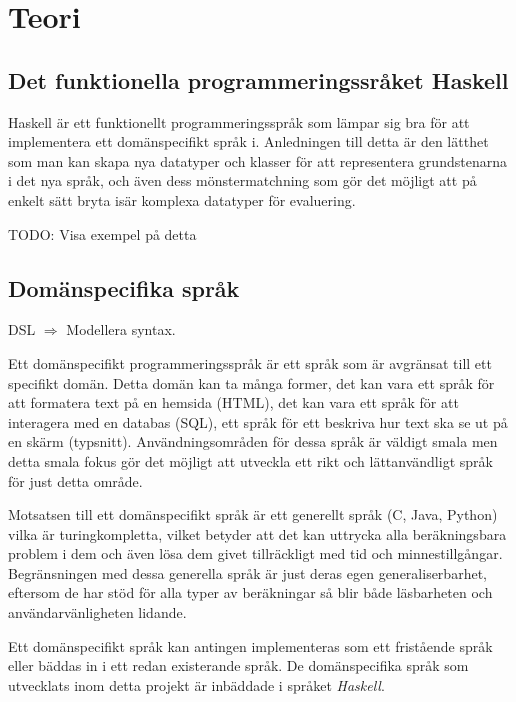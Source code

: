 
\chapter{Teori}

\section{Det funktionella programmeringssråket Haskell}

\begin{binge}
  Haskell är ett funktionellt programmeringsspråk som lämpar sig bra för att
  implementera ett domänspecifikt språk i. Anledningen till detta är den lätthet
  som man kan skapa nya datatyper och klasser för att representera grundstenarna
  i det nya språk, och även dess mönstermatchning som gör det möjligt att på
  enkelt sätt bryta isär komplexa datatyper för evaluering.
  
  TODO: Visa exempel på detta
\end{binge}

\section{Domänspecifika språk}
\begin{binge}
DSL $\Rightarrow$ Modellera syntax.
\end{binge}
\begin{draft}
  Ett domänspecifikt programmeringsspråk är ett språk som är avgränsat till ett
  specifikt domän. Detta domän kan ta många former, det kan vara ett språk för
  att formatera text på en hemsida (HTML), det kan vara ett språk för att
  interagera med en databas (SQL), ett språk för ett beskriva hur text ska se
  ut på en skärm  (typsnitt). Användningsområden för dessa språk är väldigt
  smala men detta smala fokus gör det möjligt att utveckla ett rikt och
  lättanvändligt språk för just detta område. 

  Motsatsen till ett domänspecifikt språk är ett generellt språk (C, Java,
  Python) vilka är turingkompletta, vilket betyder att det kan uttrycka alla
  beräkningsbara problem i dem och även lösa dem givet tillräckligt med tid och
   minnestillgångar. Begränsningen med dessa generella språk är
  just deras egen generaliserbarhet, eftersom de har stöd för alla typer av
  beräkningar så blir både läsbarheten och användarvänligheten lidande.
  
  Ett domänspecifikt språk kan antingen implementeras som ett fristående språk
  eller bäddas in i ett redan existerande språk. De domänspecifika språk som
  utvecklats inom detta projekt är inbäddade i språket \textit{Haskell}.
\end{draft}



